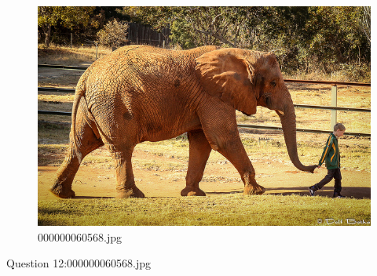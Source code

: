     \begin{figure}[h]
        \centering
        \includegraphics[width=0.8\linewidth]{../image set/easy/000000060568.jpg}
        \caption{000000060568.jpg}
    \end{figure}
    Question 12:000000060568.jpg
